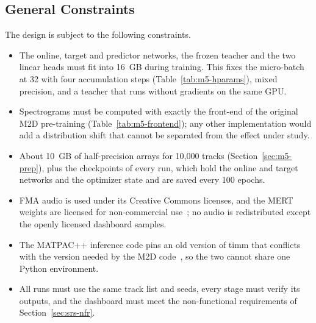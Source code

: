 \documentclass{FastFyp}
\begin{document}
\subsection{General Constraints}
The design is subject to the following constraints.
\begin{itemize}
  \item The online, target and predictor networks, the frozen teacher and the two linear heads must fit into 16~GB during training. This fixes the micro-batch at 32 with four accumulation steps (Table~\ref{tab:m5-hparams}), mixed precision, and a teacher that runs without gradients on the same GPU.
  \item Spectrograms must be computed with exactly the front-end of the original M2D pre-training (Table~\ref{tab:m5-frontend}); any other implementation would add a distribution shift that cannot be separated from the effect under study.
  \item About 10~GB of half-precision arrays for 10,000 tracks (Section~\ref{sec:m5-prep}), plus the checkpoints of every run, which hold the online and target networks and the optimizer state and are saved every 100 epochs.
  \item FMA audio is used under its Creative Commons licenses, and the MERT weights are licensed for non-commercial use~\cite{ref:MERTCard}; no audio is redistributed except the openly licensed dashboard samples.
  \item The MATPAC++ inference code pins an old version of timm that conflicts with the version needed by the M2D code~\cite{ref:MATPACGit}, so the two cannot share one Python environment.
  \item All runs must use the same track list and seeds, every stage must verify its outputs, and the dashboard must meet the non-functional requirements of Section~\ref{sec:srs-nfr}.
\end{itemize}
\end{document}
